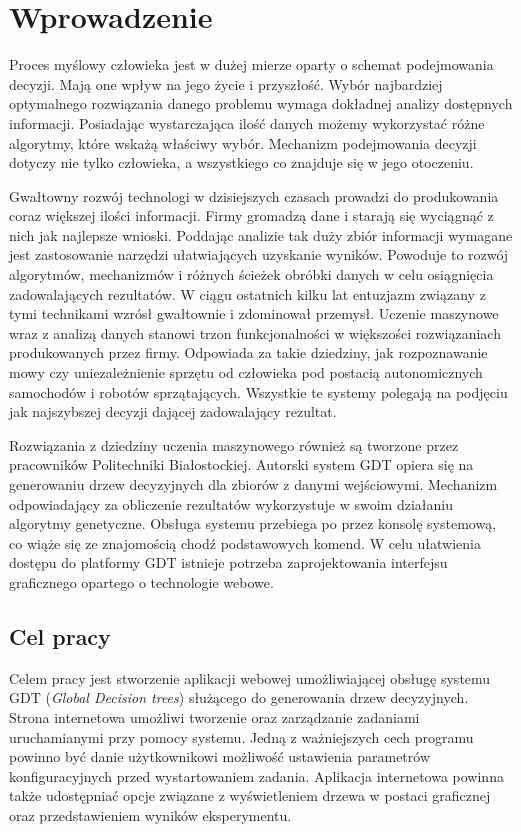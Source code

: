 \chapter*{Wprowadzenie}
Proces myślowy człowieka jest w dużej mierze oparty o schemat podejmowania decyzji. Mają one wpływ na jego życie i przyszłość. Wybór najbardziej optymalnego rozwiązania danego problemu wymaga dokładnej analizy dostępnych informacji. Posiadając wystarczająca ilość danych możemy wykorzystać różne algorytmy, które wskażą właściwy wybór. Mechanizm podejmowania decyzji dotyczy nie tylko człowieka, a wszystkiego co znajduje się w jego otoczeniu. 

Gwałtowny rozwój technologi w dzisiejszych czasach prowadzi do produkowania coraz większej ilości informacji. Firmy gromadzą dane i starają się wyciągnąć z nich jak najlepsze wnioski. Poddając analizie tak duży zbiór informacji wymagane jest zastosowanie narzędzi ułatwiających uzyskanie wyników. Powoduje to rozwój algorytmów, mechanizmów i różnych ścieżek obróbki danych w celu osiągnięcia zadowalających rezultatów. W ciągu ostatnich kilku lat entuzjazm związany z tymi technikami wzrósł gwałtownie i zdominował przemysł. Uczenie maszynowe wraz z analizą danych stanowi trzon funkcjonalności w większości rozwiązaniach produkowanych przez firmy. Odpowiada za takie dziedziny, jak rozpoznawanie mowy czy uniezależnienie sprzętu od człowieka pod postacią autonomicznych samochodów i robotów sprzątających. Wszystkie te systemy polegają na podjęciu jak najszybszej decyzji dającej zadowalający rezultat. 

Rozwiązania z dziedziny uczenia maszynowego również są tworzone przez pracowników Politechniki Białostockiej. Autorski system GDT opiera się na generowaniu drzew decyzyjnych dla zbiorów z danymi wejściowymi. Mechanizm odpowiadający za obliczenie rezultatów wykorzystuje w swoim działaniu algorytmy genetyczne. Obsługa systemu przebiega po przez konsolę systemową, co wiąże się ze znajomością chodź podstawowych komend. W celu ułatwienia dostępu do platformy GDT istnieje potrzeba zaprojektowania interfejsu graficznego opartego o technologie webowe.  

\section*{Cel pracy}
Celem pracy jest stworzenie aplikacji webowej umożliwiającej obsługę systemu GDT (\textit{Global Decision trees}) służącego do generowania drzew decyzyjnych. Strona internetowa umożliwi tworzenie oraz zarządzanie zadaniami uruchamianymi przy pomocy systemu. Jedną z ważniejszych cech programu powinno być danie użytkownikowi możliwość ustawienia parametrów konfiguracyjnych przed wystartowaniem zadania. Aplikacja internetowa powinna także udostępniać opcje związane z wyświetleniem drzewa w postaci graficznej oraz przedstawieniem wyników eksperymentu.
